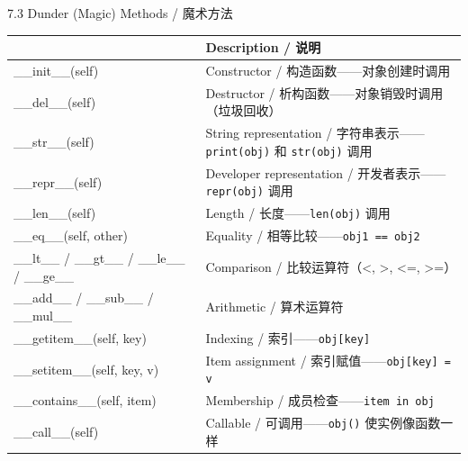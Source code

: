 \documentclass[11pt,a4paper]{report}
\let\oldtexttt\texttt
\renewcommand{\texttt}[1]{\textcolor{mainblue}{\oldtexttt{#1}}}
\begin{document}
\begin{cmdsection}{7.3  Dunder (Magic) Methods / 魔术方法}
\normalsize\renewcommand{\arraystretch}{1.4}
\centering
\begin{tabularx}{\textwidth}{@{}>{\ttfamily}l>{\raggedright\arraybackslash}X@{}}
\toprule
\multicolumn{1}{@{}l}{\textbf{Method}} & \textbf{Description / 说明} \\ \midrule
\_\_init\_\_(self)           & Constructor / 构造函数——对象创建时调用 \\
\_\_del\_\_(self)            & Destructor / 析构函数——对象销毁时调用（垃圾回收） \\
\_\_str\_\_(self)            & String representation / 字符串表示——\texttt{print(obj)} 和 \texttt{str(obj)} 调用 \\
\_\_repr\_\_(self)           & Developer representation / 开发者表示——\texttt{repr(obj)} 调用 \\
\_\_len\_\_(self)            & Length / 长度——\texttt{len(obj)} 调用 \\
\_\_eq\_\_(self, other)      & Equality / 相等比较——\texttt{obj1 == obj2} \\
\_\_lt\_\_ / \_\_gt\_\_ / \_\_le\_\_ / \_\_ge\_\_ & Comparison / 比较运算符（<, >, <=, >=） \\
\_\_add\_\_ / \_\_sub\_\_ / \_\_mul\_\_ & Arithmetic / 算术运算符 \\
\_\_getitem\_\_(self, key)   & Indexing / 索引——\texttt{obj[key]} \\
\_\_setitem\_\_(self, key, v) & Item assignment / 索引赋值——\texttt{obj[key] = v} \\
\_\_contains\_\_(self, item) & Membership / 成员检查——\texttt{item in obj} \\
\_\_call\_\_(self)           & Callable / 可调用——\texttt{obj()} 使实例像函数一样 \\
\bottomrule
\end{tabularx}
\end{cmdsection}
\end{document}
